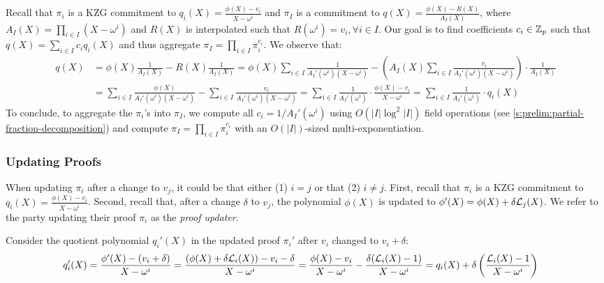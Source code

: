 Recall that $\pi_i$ is a KZG commitment to  $q_i(X)=\frac{\phi(X)-v_i}{X-\omega^i}$ and $\pi_I$ is a commitment to $q(X) = \frac{\phi(X)-R(X)}{A_I(X)}$, where $A_I(X)=\prod_{i\in I} (X-\omega^i)$ and $R(X)$ is interpolated such that $R(\omega^i)=v_i,\forall i\in I$.
Our goal is to find coefficients $c_i\in \mathbb{Z}_p$ such that $q(X)=\sum_{i\in I} c_i q_i(X)$ and thus aggregate $\pi_I=\prod_{i\in I} \pi_i^{c_i}$.
We observe that:
\begin{align}
q(X)&= \phi(X)\frac{1}{A_I(X)}- R(X)\frac{1}{A_I(X)}
		= \phi(X)\sum_{i\in I} \frac{1}{A_I'(\omega^i)(X-\omega^i)} - \left(A_I(X)\sum_{i\in I} \frac{v_i}{A_I'(\omega^i)(X-\omega^i)}\right)\cdot \frac{1}{A_I(X)} \\
		&= \sum_{i\in I} \frac{\phi(X)}{A_I'(\omega^i)(X-\omega^i)} - \sum_{i\in I} \frac{v_i}{A_I'(\omega^i)(X-\omega^i)}
		= \sum_{i\in I} \frac{1}{A_I'(\omega^i)}\cdot \frac{\phi(X) - v_i}{X-\omega^i}
		 = \sum_{i\in I} \frac{1}{A_I'(\omega^i)}\cdot q_i(X)
\end{align}
To conclude, to aggregate the $\pi_i$'s into $\pi_I$, we compute all $c_i={1}/{A_I'(\omega^i)}$ using $O(\vert I\vert \log^2{\vert I \vert})$ field operations (see \cref{s:prelim:partial-fraction-decomposition}) and compute $\pi_I=\prod_{i\in I} \pi_i^{c_i}$ with an $O(|I|)$-sized multi-exponentiation.

\subsubsection{Updating Proofs}
\label{s:asvc:from-kzg:updating-proofs}

When updating $\pi_i$ after a change to $v_j$, it could be that either (1) $i=j$ or that (2) $i\ne j$.
First, recall that $\pi_i$ is a KZG commitment to $q_i(X)=\frac{\phi(X)-v_i}{X-\omega^i}$.
Second, recall that, after a change $\delta$ to $v_j$, the polynomial $\phi(X)$ is updated to $\phi'(X)=\phi(X)+\delta\mathcal{L}_j(X)$.
We refer to the party updating their proof $\pi_i$ as the \textit{proof updater}.

Consider the quotient polynomial $q_i'(X)$ in the updated proof $\pi_i'$ after $v_i$ changed to $v_i+\delta$:
\begin{align}
q_i'(X)&=\frac{\phi'(X)-(v_i+\delta)}{X-\omega^i}=\frac{\left(\phi(X) + \delta\mathcal{L}_i(X)\right) - v_i -\delta}{X-\omega^i}=\frac{\phi(X) - v_i}{X-\omega^i}-\frac{\delta(\mathcal{L}_i(X)-1)}{X-\omega^i} = q_i(X) + \delta\left(\frac{\mathcal{L}_i(X)-1}{X-\omega^i}\right)
\end{align}

